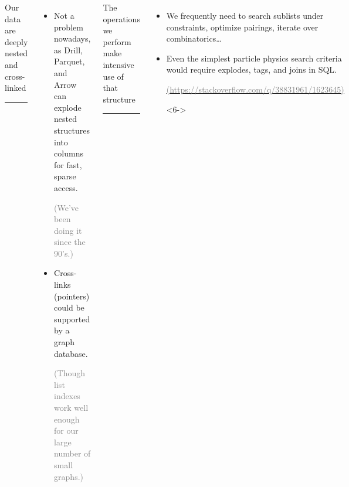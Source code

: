 \documentclass[aspectratio=169]{beamer}
\begin{document}
\begin{frame}
\vspace{0.5 cm}
\begin{columns}[t]
\begin{center}
\Large Our data are deeply nested \\ and cross-linked

\vspace{-0.25 cm}
\rule{\linewidth}{0.8 pt}
\end{center}

\vspace{-0.25 cm}
\begin{itemize}\setlength{\itemsep}{0.5 cm}
\item<2-> Not a problem nowadays, as Drill, Parquet, and Arrow can explode nested structures into columns for fast, sparse access.

\vspace{0.2 cm}
\textcolor{gray}{(We've been doing it since the 90's.)}

\item<3-> Cross-links (pointers) could be supported by a graph database.

\vspace{0.2 cm}
\textcolor{gray}{(Though list indexes work well enough for our large number of small graphs.)}

\end{itemize}

\begin{center}
\Large The operations we perform make intensive use of that structure

\vspace{-0.25 cm}
\rule{\linewidth}{0.8 pt}
\end{center}

\vspace{-0.25 cm}
\begin{itemize}
\item<4-> We frequently need to search sublists under constraints, optimize pairings, iterate over combinatorics\ldots

\item<5-> Even the simplest particle physics search criteria would require explodes, tags, and joins in SQL.

\vspace{0.2 cm}
\href{https://stackoverflow.com/q/38831961/1623645}{\textcolor{gray}{\scriptsize (https://stackoverflow.com/q/38831961/1623645)}}

\vspace{0.5 cm}
\begin{uncoverenv}<6->
\end{uncoverenv}
\end{itemize}
\end{columns}
\end{frame}
\end{document}
